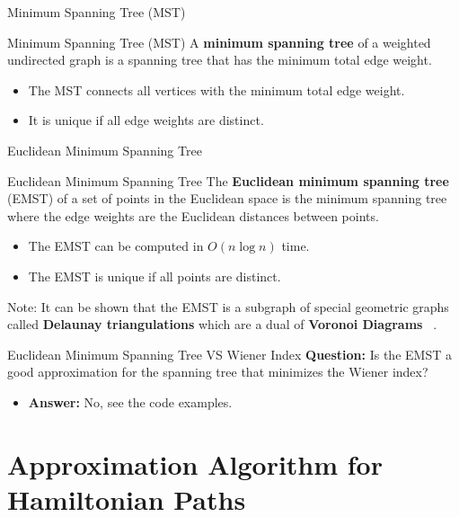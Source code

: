 \documentclass[11pt]{beamer}
\begin{document}
\begin{frame}{Minimum Spanning Tree (MST)}
	\begin{block}{Minimum Spanning Tree (MST)}
		A \textbf{minimum spanning tree} of a weighted undirected graph is a spanning tree that has the minimum total edge weight.
		\begin{itemize}
			\item The MST connects all vertices with the minimum total edge weight.
			\item It is unique if all edge weights are distinct.
		\end{itemize}
	\end{block}
\end{frame}

\begin{frame}{Euclidean Minimum Spanning Tree}
	\begin{block}{Euclidean Minimum Spanning Tree}
		The \textbf{Euclidean minimum spanning tree} (EMST) of a set of points in the Euclidean space is the minimum spanning tree where the edge weights are the Euclidean distances between points.
		\begin{itemize}
			\item The EMST can be computed in $O(n \log n)$ time.
			\item The EMST is unique if all points are distinct.
		\end{itemize}
	\end{block}
	\pause
	\vspace{0.5cm}

	Note: It can be shown that the EMST is a subgraph of special geometric graphs called \textbf{Delaunay triangulations} which are a dual of \textbf{Voronoi Diagrams} ~\cite{book:deberg_computational_geometry}.
\end{frame}

\begin{frame}{Euclidean Minimum Spanning Tree VS Wiener Index}
	\textbf{Question:} Is the EMST a good approximation for the spanning tree that minimizes the Wiener index?
	\vspace{0.3cm}
	\begin{itemize}
		\item \textbf{Answer:} No, see the code examples.
	\end{itemize}
	\vspace{0.5cm}
\end{frame}

\section{Approximation Algorithm for Hamiltonian Paths}
\end{document}
